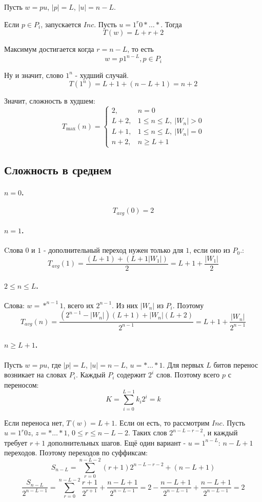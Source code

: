 \documentclass[12pt]{article}
\begin{document}
Пусть $w=pu$, $|p|=L$, $|u|=n-L$.

Если $p\in P_i$, запускается $Inc$. 
Пусть $u = 1^r0*\dots*$.
Тогда
\[
T(w)=L+r+2
\]

Максимум достигается когда $r=n-L$, то есть
\[
w=p1^{n-L}, p\in P_i
\]

Ну и значит, слово $1^n$ - худший случай.
\[
T(1^n)=L+1+(n-L+1)=n+2
\]

Значит, сложность в худшем:
\[
T_{\max}(n)=
\begin{cases}
2, & n=0\\
L+2, & 1\leq n\leq L,\ |W_n|>0\\
L+1, & 1\leq n\leq L,\ |W_n|=0\\
n+2, & n\geq L+1
\end{cases}
\]

\subsection*{Сложность в среднем}

\paragraph{$n=0$.}
\[
T_{avg}(0)=2
\]

\paragraph{$n=1$.}
Cлова $0$ и $1$ - дополнительный переход нужен
только для $1$, если оно из $P_0$.:
\[
T_{avg}(1)
=\frac{(L+1)+(L+1|W_1|)}{2}
=L+1+\frac{|W_1|}{2}
\]

\paragraph{$2\leq n\leq L$.}
Слова: $w=*^{n-1}1$, всего их
$2^{n-1}$. Из них $|W_n|$ из $P_i$. Поэтому
\[
T_{avg}(n)
=\frac{(2^{n-1}-|W_n|)(L+1)+|W_n|(L+2)}{2^{n-1}}
=L+1+\frac{|W_n|}{2^{n-1}}
\]

\paragraph{$n\geq L+1$.}
Пусть $w=pu$, где $|p|=L$, $|u|=n-L$, $u=*\dots*1$. Для первых $L$ битов перенос
возникает на словах $P_i$. Каждый $P_i$ содержит $2^i$
слов. Поэтому всего $p$ с переносом:
\[
K=\sum_{i=0}^{L-1}k_i2^i=k
\]

Если переноса нет, $T(w)=L+1$. Если он есть, то рассмотрим $Inc$.
Пусть $u=1^r0z$, $z=*\dots*1$, $0\leq r\leq n-L-2$.
Таких слов $2^{n-L-r-2}$, и каждый требует $r+1$
дополнительных шагов. Ещё один вариант - $u=1^{n-L}$:
$n-L+1$ переходов. Поэтому переходов по суффиксам:
\[
S_{n-L}=\sum_{r=0}^{n-L-2}(r+1)2^{n-L-r-2}+(n-L+1)
\]
\[
\frac{S_{n-L}}{2^{n-L-1}}
=\sum_{r=0}^{n-L-2}\frac{r+1}{2^{r+1}}
  +\frac{n-L+1}{2^{n-L-1}}
=2-\frac{n-L+1}{2^{n-L-1}}+\frac{n-L+1}{2^{n-L-1}}=2
\]
\end{document}
